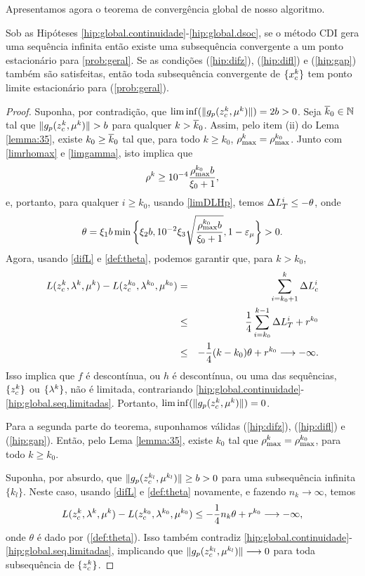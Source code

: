 Apresentamos agora o teorema de convergência global de nosso algoritmo.
\begin{theorem}\label{teo:conv-global} 
  Sob as Hipóteses \ref{hip:global.continuidade}-\ref{hip:global.dsoc}, se o
  método CDI gera uma sequência infinita então existe uma subsequência
  convergente a um ponto estacionário para \eqref{prob:geral}.
  Se as condições (\ref{hip:difz}), (\ref{hip:difl}) e (\ref{hip:gap})
  também são satisfeitas, então toda subsequência convergente de $\{x_c^{k}\}$ tem
  ponto limite estacionário para (\ref{prob:geral}).  
\end{theorem} 
\begin{proof} Suponha, por
  contradição, que $\lim\inf(\Vert g_p(z_c^{k},\mu^k)\Vert) = 2b > 0$. Seja
  $\overline{k}_0 \in \mathbb{N}$ tal que $\Vert g_p(z_c^{k},\mu^k)\Vert > b$ para
  qualquer $k > \overline{k}_0$. Assim, pelo item (ii) do Lema \ref{lemma:35},
  existe $k_0 \geq \overline{k}_0$ tal que, para todo $k \geq k_0$, $\rho_{\max}^k =
  \rho_{\max}^{k_0}$. Junto com \eqref{limrhomax} e \eqref{limgamma}, isto implica
  que $$\rho^k \geq 10^{-4}\frac{\rho_{\max}^{k_0}b}{\xi_0 + 1},$$ e, portanto, para
  qualquer $i \geq k_0$, usando \eqref{limDLHp}, temos $\Delta L_T^{i} \leq -\theta$,
  onde \begin{eqnarray} \theta =
    \xi_1b\min\bigg\{\xi_2b,10^{-2}\xi_3\sqrt{\frac{\rhomax^{k_0}b}
  {\xi_0+1}},1-\epsmu\bigg\} > 0. \visiblelbl{def:theta} \end{eqnarray} Agora,
  usando \eqref{difL} e \eqref{def:theta}, podemos garantir que, para $k > k_0$,
  \begin{eqnarray*} L(z_c^{k},\lambda^{k},\mu^k) - L(z_c^{k_0},\lambda^{k_0},\mu^{k_0}) &
  = & \sum_{i = k_0+1}^k\Delta L_c^i \\ & \leq &
  \frac{1}{4}\sum_{i=k_0}^{k-1}\Delta L_T^{i} + r^{k_0} \\ & \leq & -\frac{1}{4}(k -
  k_0)\theta + r^{k_0} \longrightarrow -\infty.  \end{eqnarray*} Isso implica
  que $f$ é descontínua, ou $h$ é descontínua, ou uma das sequências,
  $\{z_c^{k}\}$ ou $\{\lambda^{k}\}$, não é limitada, contrariando
  \ref{hip:global.continuidade}-\ref{hip:global.seq.limitadas}. Portanto,
  $\lim\inf(\Vert g_p(z_c^{k}, \mu^k)\Vert) = 0$.

Para a segunda parte do teorema, suponhamos válidas (\ref{hip:difz}),
(\ref{hip:difl}) e (\ref{hip:gap}). Então, pelo Lema \ref{lemma:35}, existe
$k_0$ tal que $\rho_{\max}^k = \rho_{\max}^{k_0}$, para todo $k \geq k_0$.

Suponha, por absurdo, que $\Vert g_p(z_c^{k_l},\mu^{k_l})\Vert \geq b > 0$ para uma
subsequência infinita $\{k_l\}$. Neste caso, usando \eqref{difL} e
\eqref{def:theta} novamente, e fazendo $n_k \longrightarrow \infty$, temos
$$L(z_c^{k},\lambda^{k},\mu^k)-L(z_c^{k_0},\lambda^{k_0},\mu^{k_0}) \leq
-\frac{1}{4}n_k\theta + r^{k_0} \longrightarrow -\infty,$$ onde $\theta$ é dado
por (\ref{def:theta}). Isso também contradiz
\ref{hip:global.continuidade}-\ref{hip:global.seq.limitadas}, implicando que
$\Vert g_p(z_c^{k_l},\mu^{k_l})\Vert \longrightarrow 0$ para toda subsequência de
$\{z_c^{k}\}$.


\end{proof}
